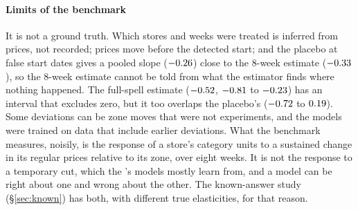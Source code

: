 \paragraph{Limits of the benchmark}
It is not a ground truth. Which stores and weeks were treated is inferred from
prices, not recorded; prices move before the detected start; and the placebo at
false start dates gives a pooled slope ($-0.26$) close to the 8-week
estimate ($-0.33$), so the 8-week estimate cannot be told from what the
estimator finds where nothing happened. The full-spell estimate
($-0.52$, $-0.81$ to $-0.23$) has an interval that excludes zero,
but it too overlaps the placebo's ($-0.72$ to $0.19$). Some deviations can be zone moves that were not
experiments, and the models were trained on data that include earlier
deviations. What the benchmark measures, noisily, is the response of a store's category units to a sustained change in its
regular prices relative to its zone, over eight weeks. It is not the response
to a temporary cut, which the \companion{} 's models mostly learn from, and a
model can be right about one and wrong about the other. The known-answer study
(\S\ref{sec:known}) has both, with different true elasticities, for that
reason.
